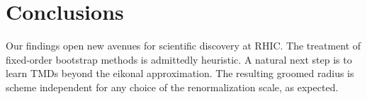 \section{Conclusions}\label{sec:conclusions}

Our findings open new avenues for scientific discovery at RHIC. The
treatment of fixed-order bootstrap methods is admittedly heuristic. A
natural next step is to learn TMDs beyond the eikonal approximation. The
resulting groomed radius is scheme independent for any choice of the
renormalization scale, as expected.

